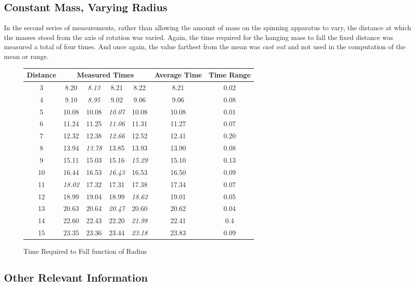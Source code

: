 \documentclass[11pt]{article}
\begin{document}
\subsection{Constant Mass, Varying Radius}
In the second series of measurements, rather than allowing the amount of mass on the spinning apparatus to vary, the distance at which the masses stood from the axis of rotation was varied. Again, the time required for the hanging mass to fall the fixed distance was measured a total of four times. And once again, the value farthest from the mean was \emph{cast out} and not used in the computation of the mean or range. 
\begin{figure}[h]
		\caption{Time Required to Fall function of Radius}
		\begin{center}
		\begin{tabular}{| c | c c c c | c | c |}
			\hline
			Distance & \multicolumn{4}{c|}{Measured Times} & Average Time & Time Range \\
			\hline
			3 & 8.20 & \emph{8.13} & 8.21 & 8.22 & 8.21 & 0.02 \\
			4 & 9.10 & \emph{8.95} & 9.02 & 9.06 & 9.06 & 0.08 \\
			5 & 10.08 & 10.08 & \emph{10.07} & 10.08 & 10.08 & 0.01 \\
			6 & 11.24 & 11.25 & \emph{11.06} & 11.31 & 11.27 & 0.07 \\
			7 & 12.32 & 12.38 & \emph{12.66} & 12.52 & 12.41 & 0.20 \\
			8 & 13.94 & \emph{13.78} & 13.85 & 13.93 & 13.90 & 0.08 \\
			9 & 15.11 & 15.03 & 15.16 & \emph{15.29} & 15.10 & 0.13 \\
			10 & 16.44 & 16.53 & \emph{16.43} & 16.53 & 16.50 & 0.09 \\
			11 & \emph{18.02} & 17.32 & 17.31 & 17.38 & 17.34 & 0.07 \\
			12 & 18.99 & 19.04 & 18.99 & \emph{18.62} & 19.01 & 0.05 \\
			13 & 20.63 & 20.64 & \emph{20.47} & 20.60 & 20.62 & 0.04 \\
			14 & 22.60 & 22.43 & 22.20 & \emph{21.98} & 22.41 & 0.4 \\
			15 & 23.35 & 23.36 & 23.44 & \emph{23.18} & 23.83 & 0.09 \\
			\hline 
		\end{tabular}
	\end{center}
\label{FIG:2}
\end{figure}
\subsection{Other Relevant Information}
\end{document}
